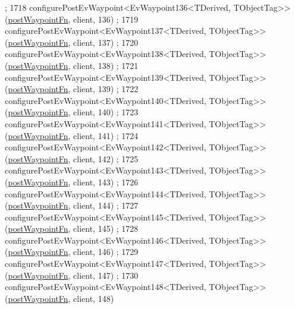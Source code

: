 \begin{DoxyCode}
      ;
1718     configurePostEvWaypoint<EvWaypoint136<TDerived, TObjectTag>>(\hyperlink{classmove__base__z__client_1_1WaypointEventDispatcher_acc538eb7506c13f7cca2268a1742dadd}{postWaypointFn}, client, 136)
      ;
1719     configurePostEvWaypoint<EvWaypoint137<TDerived, TObjectTag>>(\hyperlink{classmove__base__z__client_1_1WaypointEventDispatcher_acc538eb7506c13f7cca2268a1742dadd}{postWaypointFn}, client, 137)
      ;
1720     configurePostEvWaypoint<EvWaypoint138<TDerived, TObjectTag>>(\hyperlink{classmove__base__z__client_1_1WaypointEventDispatcher_acc538eb7506c13f7cca2268a1742dadd}{postWaypointFn}, client, 138)
      ;
1721     configurePostEvWaypoint<EvWaypoint139<TDerived, TObjectTag>>(\hyperlink{classmove__base__z__client_1_1WaypointEventDispatcher_acc538eb7506c13f7cca2268a1742dadd}{postWaypointFn}, client, 139)
      ;
1722     configurePostEvWaypoint<EvWaypoint140<TDerived, TObjectTag>>(\hyperlink{classmove__base__z__client_1_1WaypointEventDispatcher_acc538eb7506c13f7cca2268a1742dadd}{postWaypointFn}, client, 140)
      ;
1723     configurePostEvWaypoint<EvWaypoint141<TDerived, TObjectTag>>(\hyperlink{classmove__base__z__client_1_1WaypointEventDispatcher_acc538eb7506c13f7cca2268a1742dadd}{postWaypointFn}, client, 141)
      ;
1724     configurePostEvWaypoint<EvWaypoint142<TDerived, TObjectTag>>(\hyperlink{classmove__base__z__client_1_1WaypointEventDispatcher_acc538eb7506c13f7cca2268a1742dadd}{postWaypointFn}, client, 142)
      ;
1725     configurePostEvWaypoint<EvWaypoint143<TDerived, TObjectTag>>(\hyperlink{classmove__base__z__client_1_1WaypointEventDispatcher_acc538eb7506c13f7cca2268a1742dadd}{postWaypointFn}, client, 143)
      ;
1726     configurePostEvWaypoint<EvWaypoint144<TDerived, TObjectTag>>(\hyperlink{classmove__base__z__client_1_1WaypointEventDispatcher_acc538eb7506c13f7cca2268a1742dadd}{postWaypointFn}, client, 144)
      ;
1727     configurePostEvWaypoint<EvWaypoint145<TDerived, TObjectTag>>(\hyperlink{classmove__base__z__client_1_1WaypointEventDispatcher_acc538eb7506c13f7cca2268a1742dadd}{postWaypointFn}, client, 145)
      ;
1728     configurePostEvWaypoint<EvWaypoint146<TDerived, TObjectTag>>(\hyperlink{classmove__base__z__client_1_1WaypointEventDispatcher_acc538eb7506c13f7cca2268a1742dadd}{postWaypointFn}, client, 146)
      ;
1729     configurePostEvWaypoint<EvWaypoint147<TDerived, TObjectTag>>(\hyperlink{classmove__base__z__client_1_1WaypointEventDispatcher_acc538eb7506c13f7cca2268a1742dadd}{postWaypointFn}, client, 147)
      ;
1730     configurePostEvWaypoint<EvWaypoint148<TDerived, TObjectTag>>(\hyperlink{classmove__base__z__client_1_1WaypointEventDispatcher_acc538eb7506c13f7cca2268a1742dadd}{postWaypointFn}, client, 148)

\end{DoxyCode}
